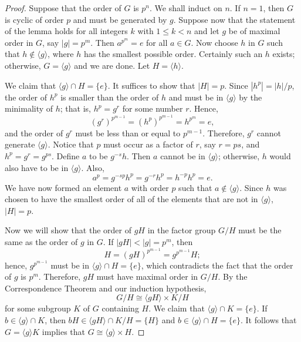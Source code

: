  
\begin{proof}
Suppose that the order of $G$ is $p^n$.  We shall induct on $n$. If
$n= 1$, then $G$ is cyclic of order $p$ and must be generated by $g$.
Suppose now that the statement of the lemma holds for all integers $k$
with $1 \leq k < n$ and let $g$ be of maximal order in $G$, say
$|g| = p^{m}$.  Then $a^{p^m} = e$ for all $a \in G$. Now choose $h$
in $G$ such that $h \notin \langle g \rangle$, where $h$ has the
smallest possible order.  Certainly such an $h$ exists; otherwise, $G
= \langle g \rangle$ and we are done.  Let $H = \langle h \rangle$.
 
 
We claim that $\langle g \rangle \cap H = \{ e \}$. It suffices to
show that $|H|=p$.  Since $|h^p| = |h| / p$, the order of $h^p$ is
smaller than the order of $h$ and must be in $\langle g \rangle$ by
the minimality of $h$; that is, $h^p = g^r$ for some number $r$.
Hence, 
\[
(g^r)^{p^{m-1}} = (h^p)^{p^{m-1}} = h^{p^{m}} = e,
\]
and the order of $g^r$ must be less than or equal to $p^{m-1}$.
Therefore, $g^r$ cannot generate $\langle g \rangle$.  Notice that $p$
must occur as a factor of $r$, say $r = ps$, and $h^p = g^r = g^{ps}$.
Define $a$ to be $g^{-s}h$. Then $a$ cannot be in $\langle g \rangle$;
otherwise, $h$ would also have to be in $\langle g \rangle$. Also, 
\[
a^p = g^{-sp} h^p = g^{-r} h^p = h^{-p} h^p = e.
\]
We have now formed an element $a$ with order $p$ such that $a \notin
\langle g \rangle$. Since $h$ was chosen to have the smallest order of
all of the elements that are not in $\langle g \rangle$, $|H|  = p$.
 
 
Now we will show that the order of $gH$ in the factor group $G/H$ 
must be the same as the order of $g$ in $G$.  If $|gH| < |g| = 
p^m$, then
\[
H = (gH)^{p^{m-1}} =  g^{p^{m-1}} H;
\]
hence, $g^{p^{m-1}}$ must be in $\langle g \rangle \cap H = \{ e \}$,
which contradicts the fact that the order of $g$ is $p^m$.  Therefore,
$gH$ must have maximal order in $G/H$.  By the Correspondence Theorem
and our induction hypothesis,
\[
G/H \cong \langle gH \rangle \times K/H
\]
for some subgroup $K$ of $G$ containing $H$.  We
claim that $\langle g \rangle \cap K = \{ e \}$. If $b \in \langle g
\rangle \cap K$, then $bH \in \langle gH \rangle \cap K/H =  \{ H \}$ and
$b \in \langle g \rangle \cap H = \{ e \}$. It follows that $G =
\langle g \rangle K$ implies that $G \cong \langle g \rangle \times H$. 
\end{proof}
 
 
 
\medskip

